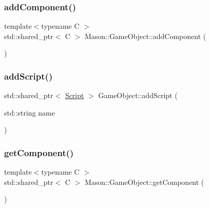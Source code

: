 \subsubsection{\texorpdfstring{add\+Component()}{addComponent()}}
{\footnotesize\ttfamily template$<$typename C $>$ \\
std\+::shared\+\_\+ptr$<$ C $>$ Mason\+::\+Game\+Object\+::add\+Component (\begin{DoxyParamCaption}{ }\end{DoxyParamCaption})}

\hypertarget{class_mason_1_1_game_object_a2c351c8c573724821be9bb14807e65ef}{}\label{class_mason_1_1_game_object_a2c351c8c573724821be9bb14807e65ef} 
\subsubsection{\texorpdfstring{add\+Script()}{addScript()}}
{\footnotesize\ttfamily std\+::shared\+\_\+ptr$<$ \hyperlink{class_mason_1_1_script}{Script} $>$ Game\+Object\+::add\+Script (\begin{DoxyParamCaption}\item[{std\+::string}]{name }\end{DoxyParamCaption})}

\hypertarget{class_mason_1_1_game_object_aa716fbc3fd56fe4f65c85d777ac62eb0}{}\label{class_mason_1_1_game_object_aa716fbc3fd56fe4f65c85d777ac62eb0} 
\subsubsection{\texorpdfstring{get\+Component()}{getComponent()}}
{\footnotesize\ttfamily template$<$typename C $>$ \\
std\+::shared\+\_\+ptr$<$ C $>$ Mason\+::\+Game\+Object\+::get\+Component (\begin{DoxyParamCaption}{ }\end{DoxyParamCaption})}

\hypertarget{class_mason_1_1_game_object_a4c013ffa8f4925e42541b462490e4dca}{}\label{class_mason_1_1_game_object_a4c013ffa8f4925e42541b462490e4dca} 
